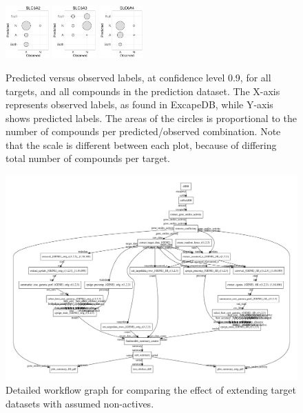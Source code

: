 \documentclass[10pt,article]{memoir}
\begin{document}
\begin{figure}[h]
\includegraphics[width=0.15\textwidth]{figures/validation_plots/slc6a2_0p9_valplot.pdf}
\includegraphics[width=0.15\textwidth]{figures/validation_plots/slc6a3_0p9_valplot.pdf}
\vspace*{10pt} %
\includegraphics[width=0.15\textwidth]{figures/validation_plots/slc6a4_0p9_valplot.pdf}

    \caption{Predicted versus observed labels, at confidence level 0.9,
    for all targets, and all compounds in the prediction dataset.
    The X-axis represents observed labels, as found in ExcapeDB, while Y-axis
    shows predicted labels. The areas of the circles is proportional to the
    number of compounds per predicted/observed combination. Note that the scale
    is different between each plot, because of differing total number of
    compounds per target.
    \label{fig:valplots_all_0.9}}
\end{figure}

\begin{figure}[h]
\includegraphics[width=\textwidth]{figures/workflow_graph_fillup_vs_not.pdf}
    \caption{Detailed workflow graph for comparing the effect of extending
    target datasets with assumed non-actives.
    \label{fig:workflow_detailed_fillup_vs_not}}
\end{figure}
\end{document}
